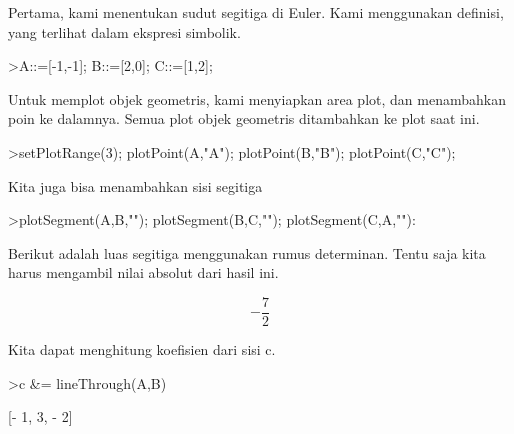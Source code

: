 \documentclass[12pt,Times new roman,letterpaper]{book}
\begin{document}
\begin{eulernootebook}
\begin{eulercomment}
\begin{eulercomment}
\begin{eulernootebook}
\begin{eulercomment}
\begin{eulercomment}
\begin{eulercomment}
\begin{eulercomment}
\begin{eulercomment}
\begin{eulercomment}
\begin{eulernotebook}
\begin{eulercomment}
\begin{eulercomment}
Pertama, kami menentukan sudut segitiga di Euler. Kami menggunakan
definisi, yang terlihat dalam ekspresi simbolik.
\end{eulercomment}
\begin{eulerprompt}
>A::=[-1,-1]; B::=[2,0]; C::=[1,2];
\end{eulerprompt}
\begin{eulercomment}
Untuk memplot objek geometris, kami menyiapkan area plot, dan
menambahkan poin ke dalamnya. Semua plot objek geometris ditambahkan
ke plot saat ini.
\end{eulercomment}
\begin{eulerprompt}
>setPlotRange(3); plotPoint(A,"A"); plotPoint(B,"B"); plotPoint(C,"C");
\end{eulerprompt}
\begin{eulercomment}
Kita juga bisa menambahkan sisi segitiga
\end{eulercomment}
\begin{eulerprompt}
>plotSegment(A,B,""); plotSegment(B,C,""); plotSegment(C,A,""):
\end{eulerprompt}
\begin{eulercomment}
Berikut adalah luas segitiga menggunakan rumus determinan. Tentu saja
kita harus mengambil nilai absolut dari hasil ini.
\end{eulercomment}
\begin{eulerformula}
\[
-\frac{7}{2}
\]
\end{eulerformula}
\begin{eulercomment}
Kita dapat menghitung koefisien dari sisi c.
\end{eulercomment}
\begin{eulerprompt}
>c &= lineThrough(A,B)
\end{eulerprompt}
\begin{euleroutput}
  
                              [- 1, 3, - 2]
  

\end{euleroutput}
\end{eulercomment}
\end{eulernotebook}
\end{eulercomment}
\end{eulercomment}
\end{eulercomment}
\end{eulercomment}
\end{eulercomment}
\end{eulercomment}
\end{eulernootebook}
\end{eulercomment}
\end{eulercomment}
\end{eulernootebook}
\end{document}
